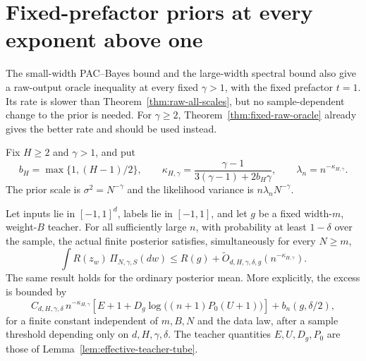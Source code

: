 \section{Fixed-prefactor priors at every exponent above one}
\label{sec:fixed-above-one-raw}

The small-width PAC--Bayes bound and the large-width spectral bound
also give a raw-output oracle inequality at every fixed
$\gamma>1$, with the fixed prefactor $t=1$.  Its rate is slower
than Theorem~\ref{thm:raw-all-scales}, but no sample-dependent change
to the prior is needed.  For $\gamma\geq2$, Theorem~\ref{thm:fixed-raw-oracle}
already gives the better rate and should be used instead.

Fix $H\geq2$ and $\gamma>1$, and put
\begin{equation}
 b_H=\max\{1,(H-1)/2\},\qquad
 \kappa_{H,\gamma}=
   \frac{\gamma-1}{3(\gamma-1)+2b_H\gamma},\qquad
 \lambda_n=n^{-\kappa_{H,\gamma}}.
 \label{eq:fixed-above-one-rate}
\end{equation}
The prior scale is $\sigma^2=N^{-\gamma}$ and the likelihood variance
is $n\lambda_nN^{-\gamma}$.

\begin{theorem}
\label{thm:fixed-above-one-raw}
Let inputs lie in $[-1,1]^d$, labels lie in $[-1,1]$, and let $g$ be a
fixed width-$m$, weight-$B$ teacher.  For all sufficiently large $n$,
with probability at least $1-\delta$ over the sample, the actual
finite posterior satisfies, simultaneously for every $N\geq m$,
\begin{equation}
 \int R(z_w)\,\Pi_{N,\gamma,S}(dw)
 \leq R(g)+\widetilde O_{d,H,\gamma,\delta,g}
                         (n^{-\kappa_{H,\gamma}}).
 \label{eq:fixed-above-one-oracle}
\end{equation}
The same result holds for the ordinary posterior mean.  More
explicitly, the excess is bounded by
\begin{equation}
 C_{d,H,\gamma,\delta}\,n^{-\kappa_{H,\gamma}}
 \left[E+1+D_g\log\bigl((n+1)P_0(U+1)\bigr)\right]
       +b_n(g,\delta/2),
 \label{eq:fixed-above-one-teacher}
\end{equation}
for a finite constant independent of $m,B,N$ and the data law, after a
sample threshold depending only on $d,H,\gamma,\delta$.
The teacher quantities $E,U,D_g,P_0$ are those of
Lemma~\ref{lem:effective-teacher-tube}.
\end{theorem}

